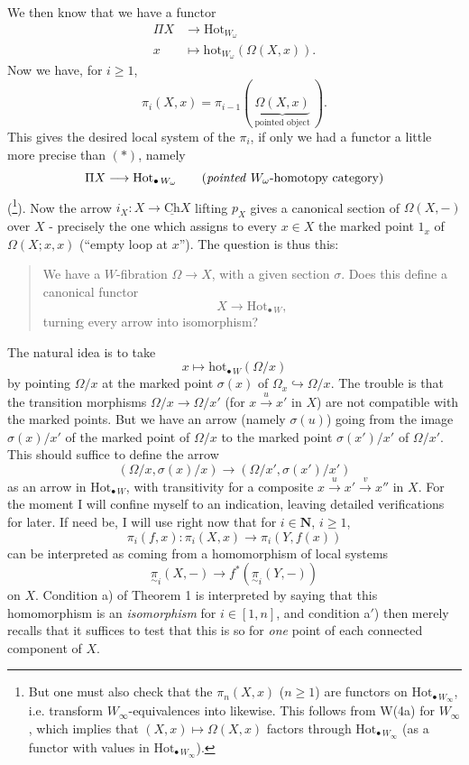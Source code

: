 \documentclass[11pt]{article}
\newcommand{\printedpage}[1]{\marginpar{\footnotesize p.~#1}}
\newcommand{\msp}[1]{\marginpar{\footnotesize [#1]}}
\newcommand{\Ch}{\underline{\mathrm{Ch}}}
\newcommand{\Hotp}[1]{\mathrm{Hot}_{\bullet\,#1}}
\newcommand{\hotp}[1]{\mathrm{hot}_{\bullet\,#1}}
\newcommand{\utpi}{\underset{\sim}{\pi}}
\begin{document}
We then know that we have a functor
\[
\begin{aligned}
\Pi X &\longrightarrow \mathrm{Hot}_{W_\omega}\\
x &\longmapsto \mathrm{hot}_{W_\omega}(\Omega(X,x)).
\end{aligned}
\tag*{$(*)$}
\]
Now we have, for $i \geq 1$,
\[
\pi_i(X,x) = \pi_{i-1}(\ \underbrace{\Omega(X,x)}_{\text{pointed object}}\ ).
\]
This gives the desired local system of the $\pi_i$, if only we had a functor a little more precise than $(*)$, namely
\[
\Pi X \longrightarrow \Hotp{W_\omega} \qquad \text{(\textit{pointed} $W_\omega$-homotopy category)}
\]
(\footnote[114]{But one must also check that the $\pi_n(X,x)$ ($n \geq 1$) are functors on $\Hotp{W_\infty}$, i.e. transform $W_\infty$-equivalences into likewise. This follows from W(4a) for $W_\infty$, which implies that $(X,x) \mapsto \Omega(X,x)$ factors through $\Hotp{W_\infty}$ (as a functor with values in $\Hotp{W_\infty}$).}). Now the arrow $i_X : X \longrightarrow \Ch X$ lifting $p_X$ gives a canonical section of $\Omega(X,-)$ over $X$ -
\msp{page 174}
precisely the one which assigns to every $x \in X$ the marked point $1_x$ of $\Omega(X;x,x)$ (``empty loop at $x$''). The question is thus this:

\begin{quote}
We have a $W$-fibration $\Omega \longrightarrow X$, with a given section $\sigma$. Does this define a canonical functor %
\[
X \longrightarrow \Hotp{W},
\]
turning every arrow into isomorphism?
\end{quote}

The natural idea is to take
\[
x \longmapsto \hotp{W}(\Omega/x)
\]
by pointing $\Omega/x$ at the marked point $\sigma(x)$ of $\Omega_x \hookrightarrow \Omega/x$. The trouble is that the transition morphisms $\Omega/x \longrightarrow \Omega/x'$ (for $x \xrightarrow{u} x'$ in $X$) are not compatible with the marked points. But we have an arrow (namely $\sigma(u)$) going
\msp{page 175}
from the image $\sigma(x)/x'$ of the marked point of $\Omega/x$ to the marked point $\sigma(x')/x'$ of $\Omega/x'$. This should suffice to define the arrow
\[
(\Omega/x,\sigma(x)/x) \longrightarrow (\Omega/x',\sigma(x')/x')
\]
as an arrow in $\Hotp{W}$, with transitivity for a composite $x \xrightarrow{u} x' \xrightarrow{v} x''$ in $X$. For the moment I will confine myself
\printedpage{118}
\msp{page 176}
to an indication, leaving detailed verifications for later. If need be, I will use right now that for $i \in \mathbf{N}$, $i \geq 1$,
\[
\pi_i(f,x) : \pi_i(X,x) \longrightarrow \pi_i(Y,f(x))
\]
can be interpreted as coming from a homomorphism of local systems
\[
\utpi_i(X,-) \longrightarrow f^*(\utpi_i(Y,-))
\]
on $X$. Condition a) of Theorem 1 is interpreted by saying that this homomorphism is an \textit{isomorphism} for $i \in [1,n]$, and condition a$'$) then merely recalls that it suffices to test that this is so for \textit{one} point of each connected component of $X$.
\end{document}
